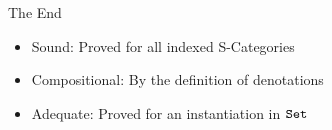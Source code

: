 
\begin{frame}{The End}
    \begin{itemize}\setlength\itemsep{3em}
        \item Sound: Proved for all indexed S-Categories \checkmark
        \item Compositional: By the definition of denotations \checkmark
        \item Adequate: Proved for an instantiation in $\texttt{Set}$ \checkmark
    \end{itemize}


    
\end{frame}
